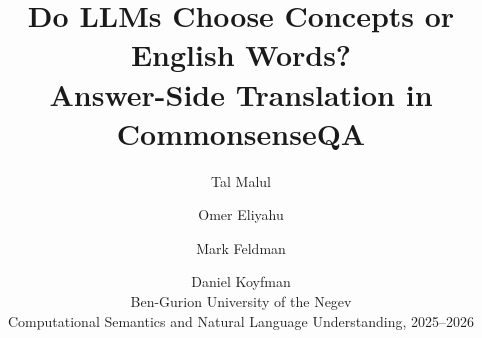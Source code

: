 \documentclass[11pt]{article}
\title{Do LLMs Choose Concepts or English Words? \\
       Answer-Side Translation in CommonsenseQA}
\author{Tal Malul \and Omer Eliyahu \and Mark Feldman \and Daniel Koyfman \\
        Ben-Gurion University of the Negev \\
        Computational Semantics and Natural Language Understanding, 2025--2026}
\begin{document}
\maketitle

\begin{abstract}
\end{abstract}










\appendix

\end{document}
